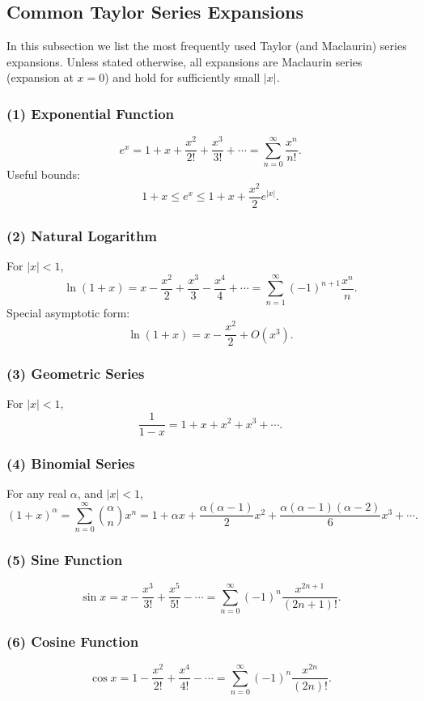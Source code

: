 \documentclass[9pt]{extarticle}
\begin{document}
\subsection{Common Taylor Series Expansions}

In this subsection we list the most frequently used Taylor (and Maclaurin)
series expansions.  Unless stated otherwise, all expansions are Maclaurin
series (expansion at \(x=0\)) and hold for sufficiently small \(|x|\).

\subsubsection*{(1) Exponential Function}
\[
e^x
    = 1 + x + \frac{x^2}{2!} + \frac{x^3}{3!} + \cdots
    = \sum_{n=0}^\infty \frac{x^n}{n!}.
\]
Useful bounds:
\[
1+x \le e^x \le 1 + x + \frac{x^2}{2}e^{|x|}.
\]

\subsubsection*{(2) Natural Logarithm}
For \(|x|<1\),
\[
\ln(1+x)
    = x - \frac{x^2}{2} + \frac{x^3}{3} - \frac{x^4}{4} + \cdots
    = \sum_{n=1}^\infty (-1)^{n+1}\frac{x^n}{n}.
\]
Special asymptotic form:
\[
\ln(1+x) = x - \frac{x^2}{2} + O(x^3).
\]

\subsubsection*{(3) Geometric Series}
For \(|x|<1\),
\[
\frac{1}{1-x}
    = 1 + x + x^2 + x^3 + \cdots.
\]

\subsubsection*{(4) Binomial Series}
For any real \(\alpha\), and \(|x|<1\),
\[
(1+x)^\alpha
    = \sum_{n=0}^{\infty}
      {\alpha \choose n} x^n
    = 1 + \alpha x + \frac{\alpha(\alpha-1)}{2}x^2
        + \frac{\alpha(\alpha-1)(\alpha-2)}{6}x^3 + \cdots.
\]

\subsubsection*{(5) Sine Function}
\[
\sin x
= x - \frac{x^3}{3!} + \frac{x^5}{5!} - \cdots
= \sum_{n=0}^{\infty} (-1)^n \frac{x^{2n+1}}{(2n+1)!}.
\]

\subsubsection*{(6) Cosine Function}
\[
\cos x
= 1 - \frac{x^2}{2!} + \frac{x^4}{4!} - \cdots
= \sum_{n=0}^{\infty} (-1)^n \frac{x^{2n}}{(2n)!}.
\]
\end{document}
